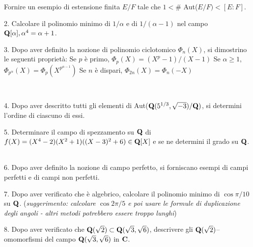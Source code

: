  Fornire un esempio di estensione finita $E/F$ tale che $1<$\# Aut($E/F)<[E:F]$.\medskip\bigskip\bigskip





\item{2.} Calcolare il polinomio minimo di $1/\alpha$ e di $1/(\alpha-1)$ nel campo ${\bf Q}[\alpha],\alpha^4=\alpha+1$.\vv


\item{3.} Dopo aver definito la nozione di polinomio ciclotomico $\Phi_n(X)$, si dimostrino le seguenti propriet\`a:\smallskip
{} Se $p$ \`e primo, $\Phi_p(X)=(X^p-1)/(X-1)$\smallskip
{} Se $\alpha\ge1$, $\Phi_{p^\alpha}(X)=\Phi_p(X^{p^{\alpha-1}})$\smallskip
{} Se $n$ \`e dispari, $\Phi_{2n}(X)=\Phi_n(-X)$


\ve\ \vs


\item{4.} Dopo aver descritto tutti gli elementi di Aut(${\bf Q}(5^{1/3},\sqrt{-3})/{\bf Q})$, si determini l'ordine di ciascuno di essi.\vv

\item{5.} Determinare il campo di spezzamento su ${\bf Q}$ di $f(X)=(X^4-2)(X^2+1)((X-3)^2+6)\in{\bf Q}[X]$ e se ne determini il grado su ${\bf Q}$.
\ve\ \vs


\item{6.} Dopo aver definito la nozione di campo perfetto, si forniscano esempi di campi perfetti e di campi non perfetti.\vv\vv


\item{7.}   Dopo aver verificato che \`e algebrico, calcolare
il polinomio minimo di $\cos \pi/10$ su ${\bf Q}$. ({\it suggerimento: calcolare $\cos2\pi/5$ e poi usare le formule di duplicazione degli angoli - altri metodi potrebbero essere troppo lunghi})
\vv\vv


\item{8.} Dopo aver verificato che ${\bf Q}(\sqrt{2})\subset{\bf Q}(\sqrt3,\sqrt6)$, descrivere gli ${\bf Q}(\sqrt{2})$--omomorfismi del campo 
${\bf Q}(\sqrt3,\sqrt6)$ in ${\bf C}$.

\vv

\ \vst
 \bye
